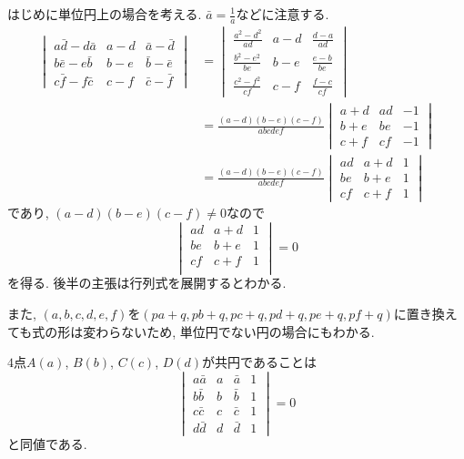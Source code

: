 \begin{prf*}
はじめに単位円上の場合を考える.
$\bar{a}=\frac 1a$などに注意する.
\begin{align*}
\begin{vmatrix}a\bar{d}-d\bar{a}&a-d&\bar{a}-\bar{d}\\b\bar{e}-e\bar{b}&b-e&\bar{b}-\bar{e}\\c\bar{f}-f\bar{c}&c-f&\bar{c}-\bar{f}\end{vmatrix}
&=\begin{vmatrix}\frac{a^2-d^2}{ad}&a-d&\frac{d-a}{ad}\\\frac{b^2-e^2}{be}&b-e&\frac{e-b}{be}\\\frac{c^2-f^2}{cf}&c-f&\frac{f-c}{cf}\end{vmatrix}\\
&=\frac{(a-d)(b-e)(c-f)}{abcdef}\begin{vmatrix}a+d&ad&-1\\b+e&be&-1\\c+f&cf&-1\end{vmatrix}\\
&=\frac{(a-d)(b-e)(c-f)}{abcdef}\begin{vmatrix}ad&a+d&1\\be&b+e&1\\cf&c+f&1\end{vmatrix}
\end{align*}
であり, $(a-d)(b-e)(c-f)\neq 0$なので
\[\begin{vmatrix}
ad&a+d&1\\
be&b+e&1\\
cf&c+f&1\\
\end{vmatrix}=0\]
を得る.
後半の主張は行列式を展開するとわかる.

また, $(a,b,c,d,e,f)$を$(pa+q,pb+q,pc+q,pd+q,pe+q,pf+q)$に置き換えても式の形は変わらないため, 単位円でない円の場合にもわかる.
\end{prf*}
%
%
\begin{bthm}\label{thm:concyclic1}
$4$点$A(a)$, $B(b)$, $C(c)$, $D(d)$が共円であることは
\[
\begin{vmatrix}a\bar{a}&a&\bar{a}&1\\b\bar{b}&b&\bar{b}&1\\c\bar{c}&c&\bar{c}&1\\d\bar{d}&d&\bar{d}&1\end{vmatrix}=0
\]
と同値である.
\end{bthm}
